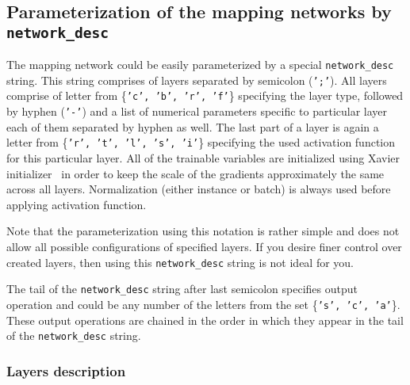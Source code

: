 \subsection[Parameterization of the mapping networks]{Parameterization of the mapping networks by \texttt{network\_desc}} \label{networkdesc}
The mapping network could be easily parameterized by a special \texttt{network\_desc} string. This string comprises of layers separated by semicolon (\texttt{';'}). All layers comprise of letter from \{\texttt{'c', 'b', 'r', 'f'}\} specifying the layer type, followed by hyphen (\texttt{'-'}) and a list of numerical parameters specific to particular layer each of them separated by hyphen as well. The last part of a layer is again a letter from \{\texttt{'r', 't', 'l', 's', 'i'}\} specifying the used activation function for this particular layer. All of the trainable variables are initialized using Xavier initializer~\cite{xavier} in order to keep the scale of the gradients approximately the same across all layers. Normalization (either instance or batch) is always used before applying activation function.

Note that the parameterization using this notation is rather simple and does not allow all possible configurations of specified layers. If you desire finer control over created layers, then using this \texttt{network\_desc} string is not ideal for you.

The tail of the \texttt{network\_desc} string after last semicolon specifies output operation and could be any number of the letters from the set \{\texttt{'s', 'c', 'a'}\}. These output operations are chained in the order in which they appear in the tail of the \texttt{network\_desc} string.

\subsubsection{Layers description}

